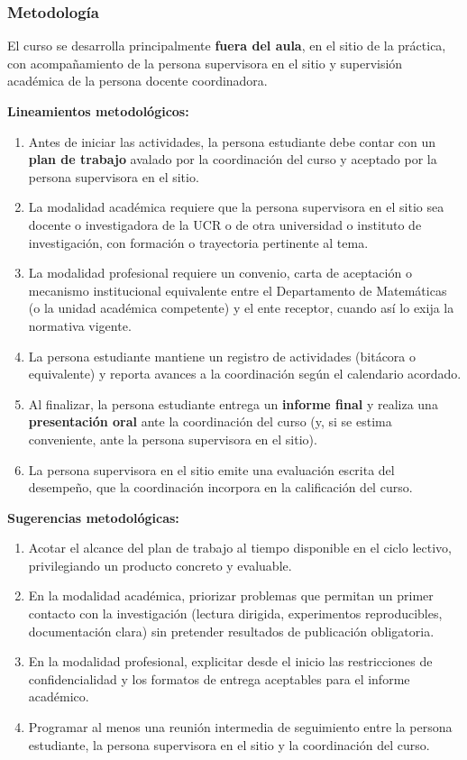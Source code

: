 \begin{refsection}
\subsubsection*{Metodología}

El curso se desarrolla principalmente \textbf{fuera del aula}, en el sitio de la práctica, con acompañamiento de la persona supervisora en el sitio y supervisión académica de la persona docente coordinadora.

\noindent \textbf{Lineamientos metodológicos:}

\begin{enumerate}
    \item Antes de iniciar las actividades, la persona estudiante debe contar con un \textbf{plan de trabajo} avalado por la coordinación del curso y aceptado por la persona supervisora en el sitio.
    \item La modalidad académica requiere que la persona supervisora en el sitio sea docente o investigadora de la UCR o de otra universidad o instituto de investigación, con formación o trayectoria pertinente al tema.
    \item La modalidad profesional requiere un convenio, carta de aceptación o mecanismo institucional equivalente entre el Departamento de Matemáticas (o la unidad académica competente) y el ente receptor, cuando así lo exija la normativa vigente.
    \item La persona estudiante mantiene un registro de actividades (bitácora o equivalente) y reporta avances a la coordinación según el calendario acordado.
    \item Al finalizar, la persona estudiante entrega un \textbf{informe final} y realiza una \textbf{presentación oral} ante la coordinación del curso (y, si se estima conveniente, ante la persona supervisora en el sitio).
    \item La persona supervisora en el sitio emite una evaluación escrita del desempeño, que la coordinación incorpora en la calificación del curso.
\end{enumerate}

\textbf{Sugerencias metodológicas:}

\begin{enumerate}
    \item Acotar el alcance del plan de trabajo al tiempo disponible en el ciclo lectivo, privilegiando un producto concreto y evaluable.
    \item En la modalidad académica, priorizar problemas que permitan un primer contacto con la investigación (lectura dirigida, experimentos reproducibles, documentación clara) sin pretender resultados de publicación obligatoria.
    \item En la modalidad profesional, explicitar desde el inicio las restricciones de confidencialidad y los formatos de entrega aceptables para el informe académico.
    \item Programar al menos una reunión intermedia de seguimiento entre la persona estudiante, la persona supervisora en el sitio y la coordinación del curso.
\end{enumerate}


\end{refsection}
